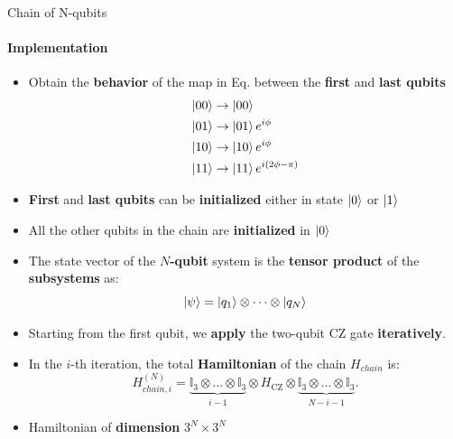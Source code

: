 \documentclass[8pt]{beamer}
\begin{document}
\begin{frame}[c]{Chain of N-qubits}
\framesubtitle{Implementation}

\begin{itemize}
    \item Obtain the \textbf{behavior} of the map in Eq. between the \textbf{first} and \textbf{last qubits}
      \begin{equation*}
    \begin{aligned}
        \left\vert{00}\right\rangle & \rightarrow \left\vert{00}\right\rangle \\
        \left\vert{01}\right\rangle & \rightarrow \left\vert{01}\right\rangle e^{i\phi} \\
        \left\vert{10}\right\rangle & \rightarrow \left\vert{10}\right\rangle e^{i\phi}\\
        \left\vert{11}\right\rangle & \rightarrow \left\vert{11}\right\rangle e^{i(2\phi-\pi)}\\
    \end{aligned}
    \label{eq:CZ-gate-map}
\end{equation*}
    \item \textbf{First} and \textbf{last qubits} can be \textbf{initialized} either in state $\left\vert{0}\right\rangle$ or $\left\vert{1}\right\rangle$
    \item All the other qubits in the chain are \textbf{initialized} in $\left\vert{0}\right\rangle$
    \item The state vector of the \textbf{$N$-qubit} system is the \textbf{tensor product} of the \textbf{subsystems} as:
    \begin{equation*}
        \left\vert{\psi}\right\rangle = \left\vert{q_1}\right\rangle \otimes \dots \otimes \left\vert{q_N}\right\rangle
    \end{equation*}
    \item Starting from the first qubit, we \textbf{apply} the two-qubit CZ gate \textbf{iteratively}. 
    \item In the $i$-th iteration, the total \textbf{Hamiltonian} of the chain $H_{chain}$ is:
    \begin{equation*}
    H_{chain,i}^{(N)} =  \underbrace{\mathbb{I}_3  \otimes \dots \otimes \mathbb{I}_3}_{i-1} \otimes H_{\text{CZ}} \otimes \underbrace{ \mathbb{I}_3  \otimes \dots \otimes \mathbb{I}_3}_{N-i-1}.
    \end{equation*}
    \item Hamiltonian of \textbf{dimension} $3^N\times 3^N$
\end{itemize}   
\end{frame}
\end{document}
